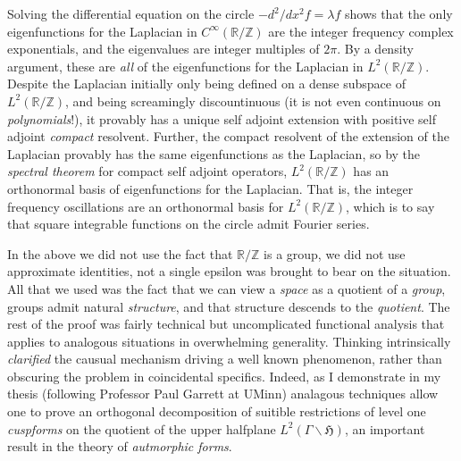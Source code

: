 \documentclass[11pt]{article} %
\theoremstyle{definition}
\begin{document}
Solving the differential equation on the circle $-d^2/dx^2 f =\lambda f$ shows that the only eigenfunctions for the Laplacian in $C^\infty(\mathbb{R}/\mathbb{Z})$ are the integer frequency complex exponentials, and the eigenvalues are integer multiples of $2\pi$. By a density argument, these are \emph{all} of the eigenfunctions for the Laplacian in $L^2(\mathbb{R}/\mathbb{Z})$. Despite the Laplacian initially only being defined on a dense subspace of $L^2(\mathbb{R}/\mathbb{Z})$, and being screamingly discountinuous (it is not even continuous on \emph{polynomials}!), it provably has a unique self adjoint extension with positive self adjoint \emph{compact} resolvent. Further, the compact resolvent of the extension of the Laplacian provably has the same eigenfunctions as the Laplacian, so by the \emph{spectral theorem} for compact self adjoint operators, $L^2(\mathbb{R}/\mathbb{Z})$ has an orthonormal basis of eigenfunctions for the Laplacian. That is, the integer frequency oscillations are an orthonormal basis for $L^2(\mathbb{R}/\mathbb{Z})$, which is to say that square integrable functions on the circle admit Fourier series. 

In the above we did not use the fact that $\mathbb{R}/\mathbb{Z}$ is a group, we did not use approximate identities, not a single epsilon was brought to bear on the situation. All that we used was the fact that we can view a \emph{space} as a quotient of a \emph{group}, groups admit natural \emph{structure}, and that structure descends to the \emph{quotient}. The rest of the proof was fairly technical but uncomplicated functional analysis that applies to analogous situations in overwhelming generality. Thinking intrinsically \emph{clarified} the causual mechanism driving a well known phenomenon, rather than obscuring the problem in coincidental specifics. Indeed, as I demonstrate in my thesis (following Professor Paul Garrett at UMinn) analagous techniques allow one to prove an orthogonal decomposition of suitible restrictions of level one \emph{cuspforms} on the quotient of the upper halfplane $L^2(\Gamma\backslash \mathfrak{H})$, an important result in the theory of \emph{autmorphic forms}.
\end{document}
